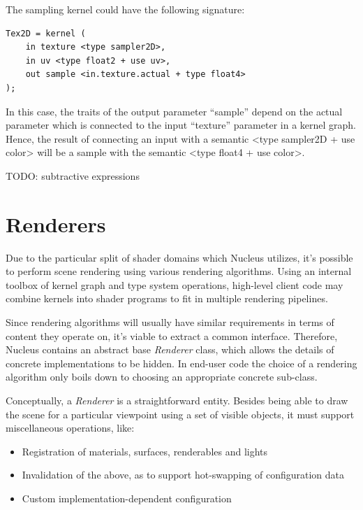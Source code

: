 The sampling kernel could have the following signature:

\begin{lstlisting}[frame=single]
Tex2D = kernel (
    in texture <type sampler2D>,
    in uv <type float2 + use uv>,
    out sample <in.texture.actual + type float4>
);
\end{lstlisting}


In this case, the traits of the output parameter ``sample'' depend on the actual parameter which is connected to the input ``texture'' parameter in a kernel graph. Hence, the result of connecting an input with a semantic <type sampler2D + use color> will be a sample with the semantic <type float4 + use color>.

TODO: subtractive expressions

\section{Renderers}
\label{sec:Renderers}

Due to the particular split of shader domains which Nucleus utilizes, it's possible to perform scene rendering using various rendering algorithms. Using an internal toolbox of kernel graph and type system operations, high-level client code may combine kernels into shader programs to fit in multiple rendering pipelines.

Since rendering algorithms will usually have similar requirements in terms of content they operate on, it's viable to extract a common interface. Therefore, Nucleus contains an abstract base \emph{Renderer} class, which allows the details of concrete implementations to be hidden. In end-user code the choice of a rendering algorithm only boils down to choosing an appropriate concrete sub-class.

Conceptually, a \emph{Renderer} is a straightforward entity. Besides being able to draw the scene for a particular viewpoint using a set of visible objects, it must support miscellaneous operations, like:

\begin{itemize}
\item Registration of materials, surfaces, renderables and lights
\item Invalidation of the above, as to support hot-swapping of configuration data
\item Custom implementation-dependent configuration
\end{itemize}

